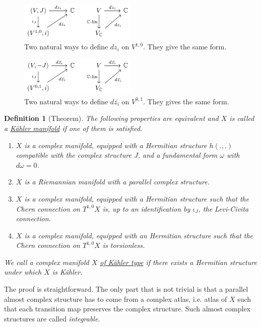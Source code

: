 \documentclass[11pt]{article}
\newtheorem{definition}{Definition}
\begin{document}
\begin{figure}[htbp]
\centering
\includegraphics[width=0.50\textwidth]{../img/dz.png}
\caption{Two natural ways to define \(dz_i\) on \(V^{1,0}\). They give the same form. \label{fig:dz}}
\end{figure}


\begin{figure}[htbp]
\centering
\includegraphics[width=0.50\textwidth]{../img/dzbar.png}
\caption{Two natural ways to define \(d\bar{z_i}\) on \(V^{0,1}\). They gives the same form. \label{fig:dzbar}}
\end{figure}


\begin{definition}[Theorem]
The following properties are equivalent and \(X\) is called a \uline{Kähler manifold} if one of them is satisfied.
\begin{enumerate}
\item \(X\) is a complex manifold, equipped with a Hermitian structure \(h(.,.)\) compatible with the complex
structure \(J\), and a fundamental form \(\omega\)  with \(d\omega=0\).
\item \(X\) is a Riemannian manifold with a parallel complex structure.
\item \(X\) is a complex manifold, equipped with a Hermitian structure such that the Chern connection on
\(T^{1,0}X\) is, up to an identification by \(\iota_J\), the Levi-Civita connection.
\item \(X\) is a complex manifold, equipped with an Hermitian structure such that the Chern connection on
\(T^{1,0}X\) is torsionless.
\end{enumerate}
We call a complex manifold \(X\) \uline{of Kähler type} if there exists a Hermitian structure under which
\(X\) is Kähler.
\end{definition}
The proof is straightforward. The only part that is not trivial is that a parallel almost complex structure
has to come from a complex atlas, i.e. atlas of \(X\) such that each transition map preserves the
complex structure. Such almost complex structures are called \emph{integrable}.
\end{document}
